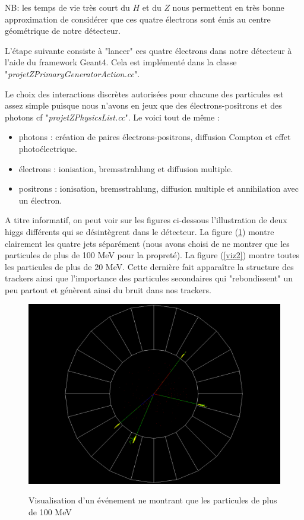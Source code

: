 \documentclass[11pt]{article}
\begin{document}
NB: les temps de vie très court
du $H$ et du $Z$ nous permettent en très bonne approximation de considérer que
ces quatre électrons sont émis au centre géométrique de notre détecteur. 

L'étape
suivante consiste à "lancer" ces quatre électrons dans notre détecteur à l'aide
du framework Geant4. Cela est implémenté dans la classe
"\textit{projetZPrimaryGeneratorAction.cc}".

Le choix des interactions discrètes autorisées pour chacune des particules est
assez simple puisque nous n'avons en jeux que des électrons-positrons et des
photons cf "\textit{projetZPhysicsList.cc}". Le voici tout de même : 
\begin{itemize}
\item photons : création de paires électrons-positrons, diffusion Compton et
effet photoélectrique.
\item électrons : ionisation, bremsstrahlung et diffusion multiple.
\item positrons : ionisation, bremsstrahlung, diffusion multiple et
annihilation avec un électron.\\ 
\end{itemize}

A titre informatif, on peut voir sur les figures ci-dessous l'illustration de
deux higgs différents qui se désintègrent dans le détecteur.
La figure (\ref{viz1}) montre clairement les quatre jets séparément (nous avons
choisi de ne montrer que les particules de plus de 100 MeV pour la propreté). La
figure (\ref{viz2}) montre toutes les particules de plus de 20 MeV. Cette
dernière fait apparaître la structure des trackers ainsi que l'importance des
particules secondaires qui "rebondissent" un peu partout et génèrent ainsi
du bruit dans nos trackers.

\begin{figure}
\caption{Visualisation d'un événement ne montrant que les particules de plus
de 100 MeV}
\includegraphics[scale=0.40]{images/evenPlus100MeV.png}
\label{viz1}
\end{figure}
\end{document}
